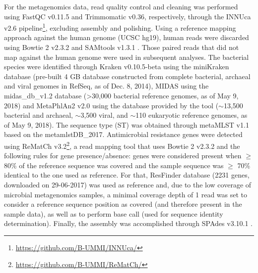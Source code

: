 For the metagenomics data, read quality control and cleaning was performed using FastQC v0.11.5 and Trimmomatic v0.36, respectively, through the INNUca v2.6 pipeline\footnote{\url{https://github.com/B-UMMI/INNUca/}}, excluding assembly and polishing. 
Using a reference mapping approach against the human genome (UCSC hg19), human reads were discarded using Bowtie 2 v2.3.2 \citep{langmead_fast_2012} and SAMtools v1.3.1 \citep{li_sequence_2009}. 
Those paired reads that did not map against the human genome were used in subsequent analyses. 
The bacterial species were identified through Kraken v0.10.5-beta \citep{wood_kraken_2014} using the miniKraken database (pre-built 4 GB database constructed from complete bacterial, archaeal and viral genomes in RefSeq, as of Dec. 8, 2014), MIDAS \citep{nayfach_integrated_2016} using the midas\_db\_v1.2 database (>30,000 bacterial reference genomes, as of May 9, 2018) and MetaPhlAn2 v2.0 \citep{segata_metagenomic_2012} using the database provided by the tool ($\sim$13,500 bacterial and archaeal, $\sim$3,500 viral, and $\sim$110 eukaryotic reference genomes, as of May 9, 2018). 
The sequence type (ST) was obtained through metaMLST v1.1 \citep{zolfo_metamlst_2017} based on the metamlstDB\_2017. 
Antimicrobial resistance genes were detected using ReMatCh v3.2\footnote{\url{https://github.com/B-UMMI/ReMatCh/}}, a read mapping tool that uses Bowtie 2 v2.3.2 \citep{langmead_fast_2012} and the following rules for gene presence/absence: genes were considered present when $\geq$ 80\% of the reference sequence was covered and the sample sequence was $\geq$ 70\% identical to the one used as reference. 
For that, ResFinder database (2231 genes, downloaded on 29-06-2017) was used as reference and, due to the low coverage of microbial metagenomics samples, a minimal coverage depth of 1 read was set to consider a reference sequence position as covered (and therefore present in the sample data), as well as to perform base call (used for sequence identity determination).
Finally, the assembly was accomplished through SPAdes v3.10.1 \citep{bankevich_spades_2012}.

